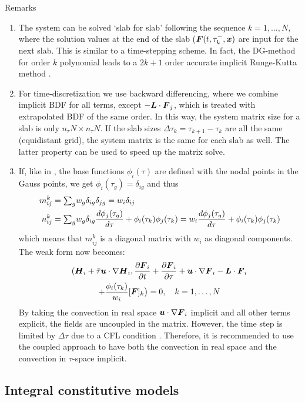 Remarks
\begin{enumerate}
 \item The system can be solved `slab for slab' following the sequence $k=1,\dots,N$, 
 where the solution values at the end of the slab 
 ($\boldsymbol{F}(t,\tau^-_{k},\boldsymbol{x})$ are input for the next slab. This is similar to a time-stepping scheme. In fact, the DG-method for order $k$ polynomial leads to a $2k+1$ order accurate implicit Runge-Kutta method \cite{Lesaint1974}.
 \item For time-discretization we use backward differencing, where we combine implicit BDF for all terms, except $-\boldsymbol{L}\cdot \boldsymbol{F}_j$, which is treated with extrapolated BDF of the same order. In this way, the system matrix size for a slab is only $n_\tau N\times n_\tau N$. If the slab sizes $\Delta\tau_k=\tau_{k+1}-\tau_k$ are all the same (equidistant grid), the system matrix is the same for each slab as well. The latter property can be used to speed up the matrix solve.
 \item If, like in \cite{Hulsen01}, the base functions $\phi_i(\tau)$ are defined with the nodal points in the Gauss points, we get $\phi_i(\tau_g)=\delta_{ig}$ and thus
 \begin{align}
 m^k_{ij}&={\textstyle\sum}_g w_g\delta_{ig}\delta_{jg}=w_i\delta_{ij}\\	
 n^k_{ij}&={\textstyle\sum}_g w_g\delta_{ig}\dfrac{d \phi_j(\tau_g)}{d \tau}+
 \phi_i(\tau_k)\phi_j(\tau_k)= w_i\dfrac{d \phi_j(\tau_g)}{d \tau}+\phi_i(\tau_k)\phi_j(\tau_k)
\end{align}
which means that $m^k_{ij}$ is a diagonal matrix with $w_i$ as diagonal components. The weak form now becomes:
\begin{multline}
    (\boldsymbol{H}_i+\bar\tau\boldsymbol{u}\cdot\nabla\boldsymbol{H}_i,\dfrac{\partial \boldsymbol{F}_i}{\partial t}+\dfrac{\partial \boldsymbol{F}_i}{\partial \tau}
           +\boldsymbol{u}\cdot\nabla\boldsymbol{F}_i-\boldsymbol{L}\cdot \boldsymbol{F}_i\\+\frac{\phi_i(\tau_k)}{w_i}[\boldsymbol{F}]_k
 \big)=0,\quad k=1,\dots,N
\end{multline}
By taking the convection in real space  $\boldsymbol{u}\cdot\nabla\boldsymbol{F}_i$ implicit and all other terms explicit, the fields are uncoupled in the matrix. However, the time step is limited by $\Delta\tau$ due to a CFL condition \cite{Hulsen01}. Therefore, it is recommended to use the coupled approach to have both the convection in real space and the convection in $\tau$-space implicit. \label{rem:decoupled}

\end{enumerate}

\subsection{Integral constitutive models}

